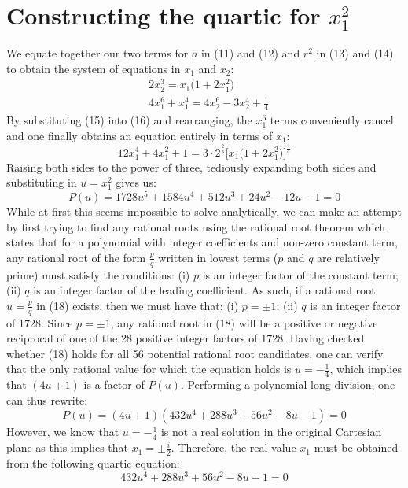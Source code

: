 \documentclass{article}
\begin{document}
\section{Constructing the quartic for $x_1^2$}
We equate together our two terms for $a$ in (11) and (12) and $r^2$ in (13) and (14) to obtain the system of equations in $x_1$ and $x_2$:
\begin{align*}
    \tag{15} &2x_2^3=x_1\big(1+2x_1^2\big) \\
    \tag{16} & 4x_1^6+x_1^4=4x_2^6-3x_2^4+\frac{1}{4}
\end{align*}
By substituting (15) into (16) and rearranging, the $x_1^6$ terms conveniently cancel and one finally obtains an equation entirely in terms of $x_1$:
\begin{equation}
    \tag{17} 12x_1^4+4x_1^2+1=3\cdot 2^\frac{2}{3}\Big[x_1\big(1+2x_1^2\big)\Big]^\frac{4}{3}
\end{equation}
\noindent Raising both sides to the power of three, tediously expanding both sides and substituting in $u=x_1^2$ gives us:
\begin{equation}
    \tag{18} P(u)=1728u^5+1584u^4+512u^3+24u^2-12u-1=0
\end{equation}
While at first this seems impossible to solve analytically, we can make an attempt by first trying to find any rational roots using the rational root theorem which states that for a polynomial with integer coefficients and non-zero constant term, any rational root of the form $\frac{p}{q}$ written in lowest terms ($p$ and $q$ are relatively prime) must satisfy the conditions:
\newline\newline
\indent (i) \space $p$ is an integer factor of the constant term;
\newline
\indent (ii) $q$ is an integer factor of the leading coefficient. 
\newline\newline
As such, if a rational root $u=\frac{p}{q}$ in (18) exists, then we must have that:
\newline\newline
\indent (i) \space $p=\pm1$;
\newline
\indent (ii) $q$ is an integer factor of 1728. 
\newline\newline
Since $p=\pm1$, any rational root in (18) will be a positive or negative reciprocal of one of the 28 positive integer factors of 1728. Having checked whether (18) holds for all 56 potential rational root candidates, one can verify that the only rational value for which the equation holds is $u=-\frac{1}{4}$, which implies that $(4u+1)$ is a factor of $P(u)$. Performing a polynomial long division, one can thus rewrite:
\begin{equation*}
    \tag{19} P(u)=(4u+1)(432u^4+288u^3+56u^2-8u-1)=0
\end{equation*}
However, we know that $u=-\frac{1}{4}$ is not a real solution in the original Cartesian plane as this implies that $x_1=\pm\frac{i}{2}$. Therefore, the real value $x_1$ must be obtained from the following quartic equation:
\begin{equation}
    \tag{20} 432u^4+288u^3+56u^2-8u-1=0
\end{equation}
\end{document}
